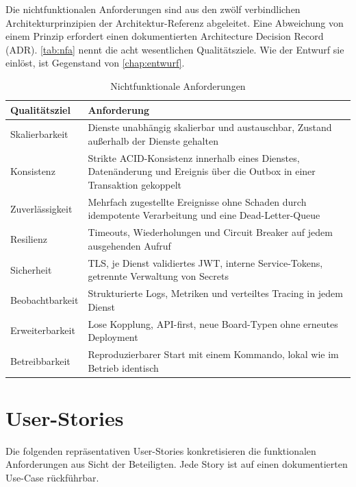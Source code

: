Die nichtfunktionalen Anforderungen sind aus den zwölf verbindlichen Architekturprinzipien der Architektur-Referenz abgeleitet. Eine Abweichung von einem Prinzip erfordert einen dokumentierten Architecture Decision Record (ADR). \vref{tab:nfa} nennt die acht wesentlichen Qualitätsziele. Wie der Entwurf sie einlöst, ist Gegenstand von \vref{chap:entwurf}.

\begin{table}[ht]
  \centering
  \caption{Nichtfunktionale Anforderungen}
  \label{tab:nfa}
  \begin{tabularx}{\linewidth}{@{}>{\raggedright\arraybackslash}p{3.4cm}X@{}}
    \toprule
    \textbf{Qualitätsziel} & \textbf{Anforderung} \\
    \midrule
    Skalierbarkeit   & Dienste unabhängig skalierbar und austauschbar, Zustand außerhalb der Dienste gehalten \\
    Konsistenz       & Strikte ACID-Konsistenz innerhalb eines Dienstes, Datenänderung und Ereignis über die Outbox in einer Transaktion gekoppelt \\
    Zuverlässigkeit  & Mehrfach zugestellte Ereignisse ohne Schaden durch idempotente Verarbeitung und eine Dead-Letter-Queue \\
    Resilienz        & Timeouts, Wiederholungen und Circuit Breaker auf jedem ausgehenden Aufruf \\
    Sicherheit       & TLS, je Dienst validiertes JWT, interne Service-Tokens, getrennte Verwaltung von Secrets \\
    Beobachtbarkeit  & Strukturierte Logs, Metriken und verteiltes Tracing in jedem Dienst \\
    Erweiterbarkeit  & Lose Kopplung, API-first, neue Board-Typen ohne erneutes Deployment \\
    Betreibbarkeit   & Reproduzierbarer Start mit einem Kommando, lokal wie im Betrieb identisch \\
    \bottomrule
  \end{tabularx}
\end{table}

\section{User-Stories}
\label{sec:user-stories}

Die folgenden repräsentativen User-Stories konkretisieren die funktionalen Anforderungen aus Sicht der Beteiligten. Jede Story ist auf einen dokumentierten Use-Case rückführbar.

